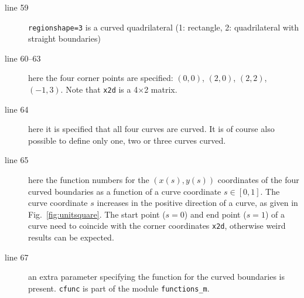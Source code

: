 \begin{description}
   \item[line 59] \texttt{regionshape=3} is a curved quadrilateral
     (1: rectangle, 
     2: quadrilateral with straight boundaries)
   \item[line 60--63] here the four corner points are specified: $(0,0)$,
         $(2,0)$, $(2,2)$, $(-1,3)$. Note that \texttt{x2d} is a 4$\times$2
        matrix.
   \item[line 64] here it is specified that all four curves are curved. It is
      of course also possible to define only one, two or three curves curved.
   \item[line 65] here the function numbers for the $(x(s),y(s))$
       coordinates of the four curved boundaries as a function of a curve
       coordinate $s\in[0,1]$. The curve coordinate $s$ increases in the
       positive direction of a curve, as given in Fig.~\ref{fig:unitsquare}.
       The start point ($s=0$) and end point
       ($s=1$) of a curve 
       need to coincide with the corner coordinates \texttt{x2d}, otherwise
       weird results can be expected.
   \item[line 67] an extra parameter specifying the function for the curved
       boundaries is present.
       \texttt{cfunc} is part of the module \texttt{functions\_m}.
\end{description}

